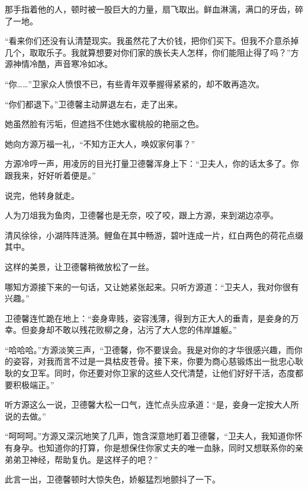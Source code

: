 \begin{this_body}
那手指着他的人，顿时被一股巨大的力量，扇飞取出。鲜血淋漓，满口的牙齿，碎了一地。

“看来你们还没有认清楚现实。我虽然花了大价钱，把你们买下。但我不介意杀掉几个，取取乐子。我就算想要对你们家的族长夫人怎样，你们能阻止得了吗？”方源神情冷酷，声音寒冷如冰。

“你……”卫家众人愤恨不已，有些青年双拳握得紧紧的，却不敢再造次。

“你们都退下。”卫德馨主动屏退左右，走了出来。

她虽然脸有污垢，但遮挡不住她水蜜桃般的艳丽之色。

她向方源万福一礼，“不知方正大人，唤奴家何事？”

方源冷哼一声，用凌厉的目光打量卫德馨浑身上下：“卫夫人，你的话太多了。你跟我来，好好听着便是。”

说完，他转身就走。

人为刀俎我为鱼肉，卫德馨也是无奈，咬了咬，跟上方源，来到湖边凉亭。

清风徐徐，小湖阵阵涟漪。鲤鱼在其中畅游，碧叶连成一片，红白两色的荷花点缀其中。

这样的美景，让卫德馨稍微放松了一丝。

哪知方源接下来的一句话，又让她紧张起来。只听方源道：“卫夫人，我对你很有兴趣。”

卫德馨连忙跪在地上：“妾身卑贱，姿容浅薄，得到方正大人的垂青，是妾身的万幸。但妾身却不敢以残花败柳之身，沾污了大人您的伟岸雄躯。”

“哈哈哈。”方源淡笑三声，“卫德馨，你不要误会。我是对你的才华很感兴趣，而你的姿容，对我而言不过是一具枯皮苍骨。接下来，你要为商心慈锻炼出一批忠心耿耿的女卫军。同时，你还要对你卫家的这些人交代清楚，让他们好好干活，态度都要积极端正。”

听方源这么一说，卫德馨大松一口气，连忙点头应承道：“是，妾身一定按大人所说的去做。”

“呵呵呵。”方源又深沉地笑了几声，饱含深意地盯着卫德馨，“卫夫人，我知道你怀有身孕。也知道你的打算，你是想保住你家丈夫的唯一血脉，同时又想联系你的亲弟弟卫神经，帮助复仇。是这样子的吧？”

此言一出，卫德馨顿时大惊失色，娇躯猛烈地颤抖了一下。

\end{this_body}

